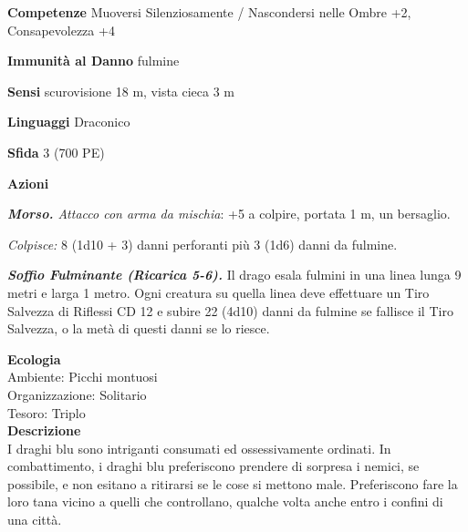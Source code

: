 \begin{multicols}{2}
\textbf{Competenze} Muoversi Silenziosamente / Nascondersi nelle Ombre +2, Consapevolezza +4

\textbf{Immunità al Danno} fulmine

\textbf{Sensi} scurovisione 18 m, vista cieca 3 m

\textbf{Linguaggi} Draconico

\textbf{Sfida} 3 (700 PE)

\textbf{Azioni}

\emph{\textbf{Morso.} Attacco con arma da mischia}: +5 a colpire, portata 1 m, un bersaglio.

\emph{Colpisce:} 8 (1d10 + 3) danni perforanti più 3 (1d6) danni da fulmine.

\emph{\textbf{Soffio Fulminante (Ricarica 5-6).}} Il drago esala fulmini in una linea lunga 9 metri e larga 1 metro. Ogni creatura su quella linea deve effettuare un Tiro Salvezza di Riflessi CD 12 e subire 22 (4d10) danni da fulmine se fallisce il Tiro Salvezza, o la metà di questi danni se lo riesce.

\textbf{Ecologia}\\
Ambiente: Picchi montuosi\\
Organizzazione: Solitario\\
Tesoro: Triplo\\
\textbf{Descrizione}\\
I draghi blu sono intriganti consumati ed ossessivamente ordinati. In combattimento, i draghi blu preferiscono prendere di sorpresa i nemici, se possibile, e non esitano a ritirarsi se le cose si mettono male. Preferiscono fare la loro tana vicino a quelli che controllano, qualche volta anche entro i confini di una città.\\


\end{multicols}
